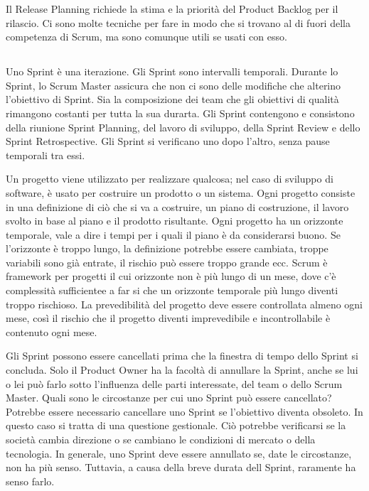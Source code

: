 Il Release Planning richiede la stima e la priorit\`a del Product Backlog per il rilascio. Ci sono molte tecniche per
fare in modo che si trovano al di fuori della competenza di Scrum, ma sono comunque utili se usati con esso.

\subsection*{\color{Blue}{SPRINT}}
\label{sec:sprint}
Uno Sprint \`e una iterazione. Gli Sprint sono intervalli temporali. Durante lo Sprint, lo Scrum Master assicura che
non ci sono delle modifiche che alterino l'obiettivo di Sprint. Sia la composizione dei team che gli obiettivi di
qualit\`a rimangono costanti per tutta la sua durarta. Gli Sprint contengono e consistono della riunione Sprint
Planning, del lavoro di sviluppo, della Sprint Review e dello Sprint Retrospective. Gli Sprint si verificano uno dopo
l'altro, senza pause temporali tra essi.


Un progetto viene utilizzato per realizzare qualcosa; nel caso di sviluppo di software, \`e usato per costruire un
prodotto o un sistema. Ogni progetto consiste in una definizione di ci\`o che si va a costruire, un piano di
costruzione, il lavoro svolto in base al piano e il prodotto risultante. Ogni progetto ha un orizzonte temporale, vale
a dire i tempi per i quali il piano \`e da considerarsi buono. Se l'orizzonte \`e troppo lungo, la definizione potrebbe
essere cambiata, troppe variabili sono gi\`a entrate, il rischio pu\`o essere troppo grande ecc. Scrum \`e framework
per progetti il cui orizzonte non \`e pi\`u lungo di un mese, dove c'\`e complessit\`a sufficientee a far si che un
orizzonte temporale pi\`u lungo diventi troppo rischioso. La prevedibilit\`a del progetto deve essere controllata
almeno ogni mese, cos\`i il rischio che il progetto diventi imprevedibile e incontrollabile \`e contenuto ogni mese.


Gli Sprint possono essere cancellati prima che la finestra di tempo dello Sprint si concluda. Solo il Product Owner ha
la facolt\`a di annullare la Sprint, anche se lui o lei pu\`o farlo sotto l'influenza delle parti interessate, del team
o dello Scrum Master. Quali sono le circostanze per cui uno Sprint pu\`o essere cancellato? Potrebbe essere necessario
cancellare uno Sprint se l'obiettivo diventa obsoleto. In questo caso si tratta di una questione gestionale. Ci\`o
potrebbe verificarsi se la societ\`a cambia direzione o se cambiano le condizioni di mercato o della tecnologia. In
generale, uno Sprint deve essere annullato se, date le circostanze, non ha pi\`u senso. Tuttavia, a causa della breve
durata dell Sprint, raramente ha senso farlo.
\newline

